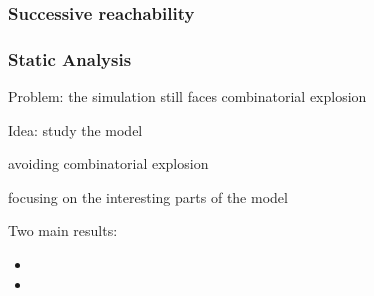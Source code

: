 
\subsubsection{Successive reachability}


\begin{frame}
  \frametitle{Static Analysis}

Problem: the simulation still faces combinatorial explosion

\bigskip
Idea: study the model 
\begin{fleches}
  \item avoiding combinatorial explosion
  \item focusing on the interesting parts of the model
\end{fleches}

\bigskip
Two main results:
\begin{itemize}
  \item {}
  \item {}
\end{itemize}
\end{frame}



